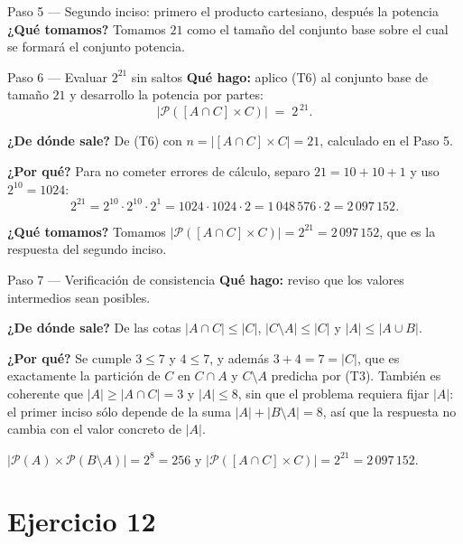\documentclass[11pt]{article}
\begin{document}
\begin{sol}
\begin{paso}{Paso 5 --- Segundo inciso: primero el producto cartesiano, después la potencia}
\textbf{¿Qué tomamos?} Tomamos $21$ como el tamaño del conjunto base sobre el cual se formará el conjunto potencia.
\end{paso}

\begin{paso}{Paso 6 --- Evaluar $2^{21}$ sin saltos}
\textbf{Qué hago:} aplico (T6) al conjunto base de tamaño $21$ y desarrollo la potencia por partes:
\[
|\mathcal{P}([A\cap C]\times C)| \;=\; 2^{\,21}.
\]

\textbf{¿De dónde sale?} De (T6) con $n = |[A\cap C]\times C| = 21$, calculado en el Paso 5.

\textbf{¿Por qué?} Para no cometer errores de cálculo, separo $21 = 10 + 10 + 1$ y uso $2^{10} = 1024$:
\[
2^{21} = 2^{10}\cdot 2^{10}\cdot 2^{1} = 1024\cdot 1024\cdot 2 = 1\,048\,576 \cdot 2 = 2\,097\,152 .
\]

\textbf{¿Qué tomamos?} Tomamos $|\mathcal{P}([A\cap C]\times C)| = 2^{21} = 2\,097\,152$, que es la respuesta del segundo inciso.
\end{paso}

\begin{paso}{Paso 7 --- Verificación de consistencia}
\textbf{Qué hago:} reviso que los valores intermedios sean posibles.

\textbf{¿De dónde sale?} De las cotas $|A\cap C| \le |C|$, $|C\setminus A|\le |C|$ y $|A|\le |A\cup B|$.

\textbf{¿Por qué?} Se cumple $3 \le 7$ y $4 \le 7$, y además $3 + 4 = 7 = |C|$, que es exactamente la partición de $C$ en $C\cap A$ y $C\setminus A$ predicha por (T3). También es coherente que $|A|\ge |A\cap C| = 3$ y $|A|\le 8$, sin que el problema requiera fijar $|A|$: el primer inciso sólo depende de la suma $|A|+|B\setminus A| = 8$, así que la respuesta no cambia con el valor concreto de $|A|$.
\end{paso}

\end{sol}

\begin{resp}
$|\mathcal{P}(A)\times \mathcal{P}(B\setminus A)| = 2^{8} = 256$ \quad y \quad $|\mathcal{P}([A\cap C]\times C)| = 2^{21} = 2\,097\,152$.
\end{resp}

\section*{Ejercicio 12}
\end{document}
